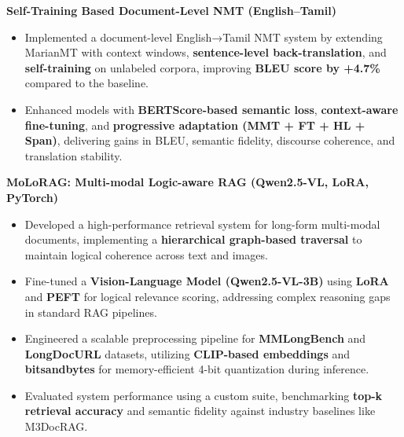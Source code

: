 \documentclass[a4paper,9pt]{extarticle} %
\newcommand{\resumeItemWithoutTitle}[1]{\item #1
}
\begin{document}
\item \textbf{Self-Training Based Document-Level NMT (English–Tamil)}
\begin{itemize}[noitemsep,topsep=0pt,leftmargin=*]
  




  \resumeItemWithoutTitle{Implemented a document-level English→Tamil NMT system by extending MarianMT with context windows, \textbf{sentence-level back-translation}, and \textbf{self-training} on unlabeled corpora, improving \textbf{BLEU score by +4.7\%} compared to the baseline.}

\resumeItemWithoutTitle{Enhanced models with \textbf{BERTScore-based semantic loss}, \textbf{context-aware fine-tuning}, and \textbf{progressive adaptation (MMT + FT + HL + Span)}, delivering gains in BLEU, semantic fidelity, discourse coherence, and translation stability.}





\end{itemize}


\item \textbf{MoLoRAG: Multi-modal Logic-aware RAG (Qwen2.5-VL, LoRA, PyTorch)}
\begin{itemize}[noitemsep,topsep=0pt,leftmargin=*]
    \resumeItemWithoutTitle{Developed a high-performance retrieval system for long-form multi-modal documents, implementing a \textbf{hierarchical graph-based traversal} to maintain logical coherence across text and images.}
    \resumeItemWithoutTitle{Fine-tuned a \textbf{Vision-Language Model (Qwen2.5-VL-3B)} using \textbf{LoRA} and \textbf{PEFT} for logical relevance scoring, addressing complex reasoning gaps in standard RAG pipelines.}
    \resumeItemWithoutTitle{Engineered a scalable preprocessing pipeline for \textbf{MMLongBench} and \textbf{LongDocURL} datasets, utilizing \textbf{CLIP-based embeddings} and \textbf{bitsandbytes} for memory-efficient 4-bit quantization during inference.}
    \resumeItemWithoutTitle{Evaluated system performance using a custom suite, benchmarking \textbf{top-k retrieval accuracy} and semantic fidelity against industry baselines like M3DocRAG.}
\end{itemize}
\end{document}
